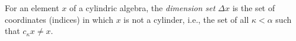 For an element $x$ of a cylindric algebra, the \textit{dimension set} $\Delta x$ is the set of coordinates (indices) in which $x$ is not a cylinder, i.e., the set of all $\kappa < \alpha$ such that $c_{\kappa} x \neq x$.
